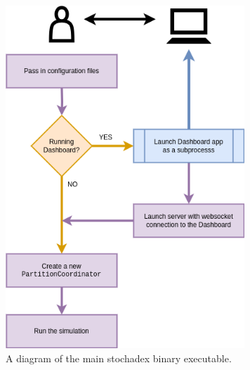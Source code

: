 \begin{figure}[h]
\centering
\includegraphics[width=9cm]{images/chapter-1-stochadex-main.drawio.png}
\caption{A diagram of the main stochadex binary executable.}
\label{fig:stochadex-main}
\end{figure}

